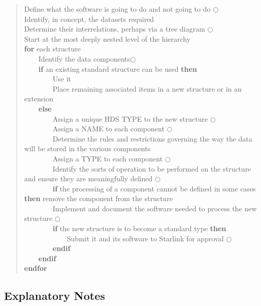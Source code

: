 \documentclass[twoside,11pt]{article}
\newcommand{\htmlref}[2]{#1}
\newcommand{\xlabel}[1]{}
\renewcommand{\_}{\texttt{\symbol{95}}}
\newcommand{\numcir}[1]{\mbox{\hspace{3ex}$\bigcirc$\hspace{-1.7ex}{\small #1}}}
\newcommand{\numcir}[1]{~~~~~~ \htmlref{{#1}}{se:expnote{#1}}}
\begin{document}
\begin{htmlonly}
\begin{quote}
Define what the software is going to do and not going to do \numcir{1} \\
Identify, in concept, the datasets required \\
Determine their interrelations, perhaps via a tree diagram \numcir{2}\\
Start at the most deeply nested level of the hierarchy\\
{\bf for} each structure \\
~~~~Identify the data components\numcir{3}\\
~~~~{\bf if} an existing standard structure can be used {\bf then} \\
~~~~~~~~Use it \\
~~~~~~~~Place remaining associated items in a new structure or in an extension \\
~~~~{\bf else} \\
~~~~~~~~Assign a unique HDS TYPE to the new structure \numcir{4}\\
~~~~~~~~Assign a NAME to each component \numcir{5}\\
~~~~~~~~Determine the rules and restrictions governing the way the data will be stored in the various components\\
~~~~~~~~Assign a TYPE to each component \numcir{6}\\
~~~~~~~~Identify the sorts of operation to be performed on the structure and ensure they are meaningfully defined \numcir{7}\\
~~~~~~~~{\bf if} the processing of a component cannot be defined in some cases {\bf then} remove the component from the structure\\
~~~~~~~~Implement and document the software needed to process the new structure \numcir{8}\\
~~~~~~~~{\bf if} the new structure is to become a standard type {\bf then} \\
~~~~~~~~~~~~Submit it and its software to Starlink for approval \numcir{9}\\
~~~~~~~~{\bf endif} \\
~~~~{\bf endif} \\
{\bf endfor} \\
\end{quote}
\end{htmlonly}


\xlabel{se_newexn}\subsection{Explanatory Notes\label{se:newexn}}
\end{document}
